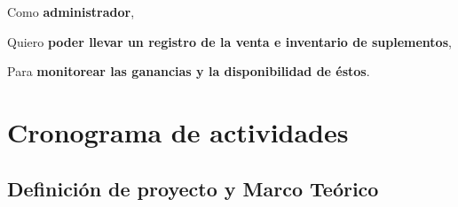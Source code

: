 \documentclass[spanish, 12pt]{article}
\begin{document}
	\noindent
	\begin{minipage}{0.498\linewidth}
		\noindent
		\begin{PostItNote}
			[Width=0.9\linewidth,Corner=true,Pin=None,Color=html5,Rotate=-1.4 ,Title={ Control de Acceso y Permisos},FontTitle={\bfseries\itshape}
			] Como \textbf{administrador},

			Quiero \textbf{poder llevar un registro de la venta e inventario de
			suplementos},

			Para \textbf{monitorear las ganancias y la disponibilidad de éstos}.
		\end{PostItNote}
		\vspace{0.5cm}
	\end{minipage}
	\section{Cronograma de actividades}
	\label{cronograma}
	\subsection{Definición de proyecto y Marco Teórico}
\end{document}
